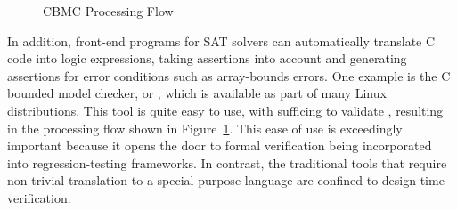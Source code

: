 \begin{figure}[tbp]
\centering
{}
\caption{CBMC Processing Flow}
\label{fig:formal:CBMC Processing Flow}
\end{figure}

In addition, front-end programs for SAT solvers can automatically translate
C code into logic expressions, taking assertions into account and generating
assertions for error conditions such as array-bounds errors.
One example is the C bounded model checker, or , which is
available as part of many Linux distributions.
This tool is quite easy to use, with  sufficing to
validate , resulting in the processing flow shown in
Figure~\ref{fig:formal:CBMC Processing Flow}.
This ease of use is exceedingly important because it opens the door
to formal verification being incorporated into regression-testing
frameworks.
In contrast, the traditional tools that require non-trivial translation
to a special-purpose language are confined to design-time verification.
\fi

